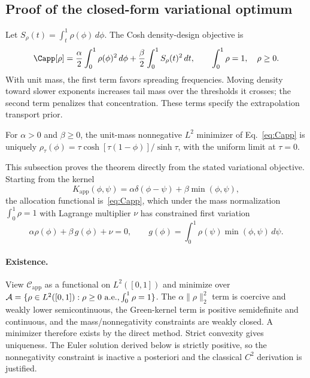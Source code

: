 \subsection{Proof of the closed-form variational optimum}

Let $S_\rho(t)=\int_t^1\rho(\phi)\,d\phi$. The Cosh density-design objective is
\begin{equation}
\Capp[\rho]=\frac\alpha2\int_0^1\rho(\phi)^2\,d\phi+
\frac\beta2\int_0^1S_\rho(t)^2\,dt,
\qquad \int_0^1\rho=1,\quad\rho\ge0.
\label{eq:Capp}
\end{equation}
With unit mass, the first term favors spreading frequencies. Moving density
toward slower exponents increases tail mass over the thresholds it crosses;
the second term penalizes that concentration. These terms specify the
extrapolation transport prior.

\begin{theorem}\label{thm:ode}
For $\alpha>0$ and $\beta\ge0$, the unit-mass nonnegative $L^2$ minimizer of Eq.~\eqref{eq:Capp} is uniquely $\rho_\tau(\phi)=\tau\cosh[\tau(1-\phi)]/\sinh\tau$, with the uniform limit at $\tau=0$.
\end{theorem}
This subsection proves the theorem directly from the stated
variational objective. Starting from the kernel
\begin{equation}
K_{\mathrm{app}}(\phi,\psi)=\alpha\delta(\phi-\psi)+\beta\min(\phi,\psi),
\end{equation}
the allocation functional is~\eqref{eq:Capp}, which under the mass normalization $\int_0^1\rho=1$ with Lagrange multiplier $\nu$ has constrained first variation
\begin{equation}
\alpha\rho(\phi) + \beta\,g(\phi) + \nu = 0,\qquad
g(\phi) = \int_0^1 \rho(\psi)\min(\phi,\psi)\,d\psi.
\end{equation}
\paragraph{Existence.}
View $\mathcal{C}_{\mathrm{app}}$ as a functional on $L^2([0,1])$ and minimize over $\mathcal{A}=\{\rho\in L^2([0,1]):\rho\ge0\ {\rm a.e.},\int_0^1\rho=1\}$. The $\alpha\|\rho\|_2^2$ term is coercive and weakly lower semicontinuous, the Green-kernel term is positive semidefinite and continuous, and the mass/nonnegativity constraints are weakly closed. A minimizer therefore exists by the direct method. Strict convexity gives uniqueness. The Euler solution derived below is strictly positive, so the nonnegativity constraint is inactive a posteriori and the classical $C^2$ derivation is justified.

